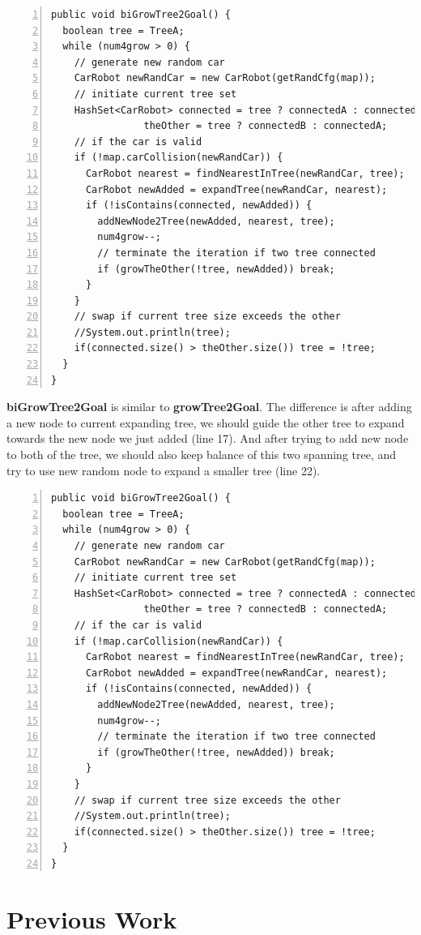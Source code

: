 \documentclass{article}
\begin{document}
\begin{lstlisting}[numbers=left]
public void biGrowTree2Goal() {
  boolean tree = TreeA;
  while (num4grow > 0) {
    // generate new random car
    CarRobot newRandCar = new CarRobot(getRandCfg(map));
    // initiate current tree set
    HashSet<CarRobot> connected = tree ? connectedA : connectedB,
                theOther = tree ? connectedB : connectedA;
    // if the car is valid
    if (!map.carCollision(newRandCar)) {
      CarRobot nearest = findNearestInTree(newRandCar, tree);
      CarRobot newAdded = expandTree(newRandCar, nearest);
      if (!isContains(connected, newAdded)) {
        addNewNode2Tree(newAdded, nearest, tree);
        num4grow--;
        // terminate the iteration if two tree connected
        if (growTheOther(!tree, newAdded)) break;
      }
    }
    // swap if current tree size exceeds the other
    //System.out.println(tree);
    if(connected.size() > theOther.size()) tree = !tree;
  }
}
\end{lstlisting}



\textbf{biGrowTree2Goal} is similar to \textbf{growTree2Goal}. The difference is after adding a new node to current expanding tree, we should guide the other tree to expand towards the new node we just added (line 17). And after trying to add new node to both of the tree, we should also keep balance of this two spanning tree, and try to use new random node to expand a smaller tree (line 22).

\begin{lstlisting}[numbers=left]
public void biGrowTree2Goal() {
  boolean tree = TreeA;
  while (num4grow > 0) {
    // generate new random car
    CarRobot newRandCar = new CarRobot(getRandCfg(map));
    // initiate current tree set
    HashSet<CarRobot> connected = tree ? connectedA : connectedB,
                theOther = tree ? connectedB : connectedA;
    // if the car is valid
    if (!map.carCollision(newRandCar)) {
      CarRobot nearest = findNearestInTree(newRandCar, tree);
      CarRobot newAdded = expandTree(newRandCar, nearest);
      if (!isContains(connected, newAdded)) {
        addNewNode2Tree(newAdded, nearest, tree);
        num4grow--;
        // terminate the iteration if two tree connected
        if (growTheOther(!tree, newAdded)) break;
      }
    }
    // swap if current tree size exceeds the other
    //System.out.println(tree);
    if(connected.size() > theOther.size()) tree = !tree;
  }
}
\end{lstlisting}




\clearpage
\section{Previous Work}
\end{document}
